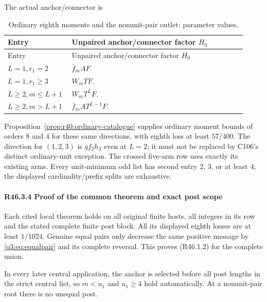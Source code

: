 The actual anchor/connector is


\begingroup\small
\setlength{\tabcolsep}{3pt}
\setlength{\LTleft}{0pt}\setlength{\LTright}{\fill}
\begin{longtable}{@{}p{0.2200\linewidth}p{0.7000\linewidth}@{}}
\caption{Ordinary eighth moments and the nonunit-pair outlet: parameter values.}\label{tab:parameters:r2-c046:3}\\
\toprule
Entry & Unpaired anchor/connector factor \(H_0\) \\
\midrule\endfirsthead
\toprule
Entry & Unpaired anchor/connector factor \(H_0\) \\
\midrule\endhead
\bottomrule\endfoot
\(L=1,\allowbreak r_{1}=2\) & \(\bar f_m A F\). \\
\addlinespace[2pt]
\(L=1,\allowbreak r_{1}\ge 3\) & \(W_m T F\). \\
\addlinespace[2pt]
\(L\ge 2,\allowbreak m\le L+1\) & \(W_m T^L F\). \\
\addlinespace[2pt]
\(L\ge 2,\allowbreak m>L+1\) & \(\bar f_m AT^{L-1}F\). \\
\end{longtable}
\endgroup


Proposition~\ref{prop:r40:ordinary-catalogue} supplies ordinary moment bounds of orders \(8\) and \(4\)
for these same directions, with eighth loss
at least \(57/400\). The direction for \((1,\allowbreak 2,\allowbreak 3)\) is \(qf_2h_3\) even at \(L=2\);
it must not be replaced by C106's distinct ordinary-unit exception.
The crossed five-arm row uses exactly its existing arms.
Every unit-minimum odd list has second entry \(2\), \(3\), or at least \(4\);
the displayed cardinality/prefix splits are exhaustive.

\paragraph{R46.3.4 Proof of the common theorem and exact post scope}

Each cited local theorem holds on all original finite hosts,
all integers in its row and the stated complete finite post block.
All its displayed eighth losses are at least \(1/1024.\) Genuine
equal pairs only decrease the same positive message by \eqref{q3:eq:equalpair} and its complete reversal.
This proves (R46.1.2) for the complete union.

In every later
central application, the anchor is selected before all post
lengths in the strict central list, so \(m<u_{1}\) and \(u_{1}\ge 4\) hold
automatically. At a nonunit-pair root there is no unequal post.


